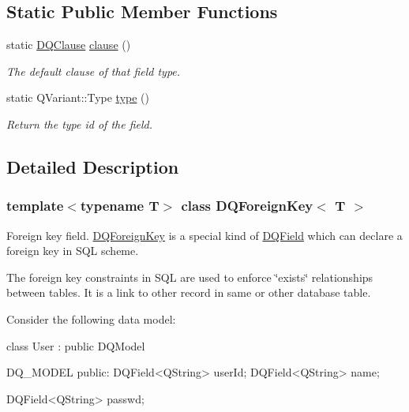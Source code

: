 \subsection*{Static Public Member Functions}
\begin{DoxyCompactItemize}
\item 
\hypertarget{classDQForeignKey_ae57ffa605d06064e7568e8f5af478205}{
static \hyperlink{classDQClause}{DQClause} \hyperlink{classDQForeignKey_ae57ffa605d06064e7568e8f5af478205}{clause} ()}
\label{classDQForeignKey_ae57ffa605d06064e7568e8f5af478205}

\begin{DoxyCompactList}\small\item\em The default clause of that field type. \item\end{DoxyCompactList}\item 
\hypertarget{classDQField_a0e5a0f071bf01560f4c47d233ca726e9}{
static QVariant::Type \hyperlink{classDQField_a0e5a0f071bf01560f4c47d233ca726e9}{type} ()}
\label{classDQField_a0e5a0f071bf01560f4c47d233ca726e9}

\begin{DoxyCompactList}\small\item\em Return the type id of the field. \item\end{DoxyCompactList}\end{DoxyCompactItemize}


\subsection{Detailed Description}
\subsubsection*{template$<$typename T$>$ class DQForeignKey$<$ T $>$}

Foreign key field. \hyperlink{classDQForeignKey}{DQForeignKey} is a special kind of \hyperlink{classDQField}{DQField} which can declare a foreign key in SQL scheme.

The foreign key constraints in SQL are used to enforce \char`\"{}exists\char`\"{} relationships between tables. It is a link to other record in same or other database table.

Consider the following data model:


\begin{DoxyCode}
class User : public DQModel
{
    DQ_MODEL
public:
    DQField<QString> userId;
    DQField<QString> name;

    DQField<QString> passwd;
}
\end{DoxyCode}


